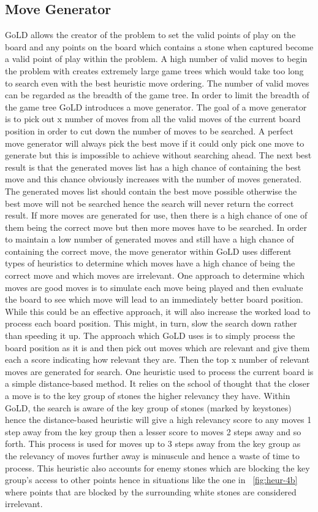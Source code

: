 \documentclass{l4proj}
\begin{document}
\subsection{Move Generator}
GoLD allows the creator of the problem to set the valid points of play on the board and any points on the board which contains a stone when captured become a valid point of play within the problem. A high number of valid moves to begin the problem with creates extremely large game trees which would take too long to search even with the best heuristic move ordering. The number of valid moves can be regarded as the breadth of the game tree. In order to limit the breadth of the game tree GoLD introduces a move generator.
The goal of a move generator is to pick out x number of moves from all the valid moves of the current board position in order to cut down the number of moves to be searched. A perfect move generator will always pick the best move if it could only pick one move to generate but this is impossible to achieve without searching ahead.  The next best result is that the generated moves list has a high chance of containing the best move and this chance obviously increases with the number of moves generated. The generated moves list should contain the best move possible otherwise the best move will not be searched hence the search will never return the correct result. If more moves are generated for use, then there is a high chance of one of them being the correct move but then more moves have to be searched. In order to maintain a low number of generated moves and still have a high chance of containing the correct move, the move generator within GoLD uses different types of heuristics to determine which moves have a high chance of being the correct move and which moves are irrelevant.
One approach to determine which moves are good moves is to simulate each move being played and then evaluate the board to see which move will lead to an immediately better board position. While this could be an effective approach, it will also increase the worked load to process each board position. This might, in turn, slow the search down rather than speeding it up. The approach which GoLD uses is to simply process the board position as it is and then pick out moves which are relevant and give them each a score indicating how relevant they are.  Then the top x number of relevant moves are generated for search.
One heuristic used to process the current board is a simple distance-based method. It relies on the school of thought that the closer a move is to the key group of stones the higher relevancy they have. Within GoLD, the search is aware of the key group of stones (marked by keystones) hence the distance-based heuristic will give a high relevancy score to any moves 1 step away from the key group then a lesser score to moves 2 steps away and so forth. This process is used for moves up to 3 steps away from the key group as the relevancy of moves further away is minuscule and hence a waste of time to process. This heuristic also accounts for enemy stones which are blocking the key group's access to other points hence in situations like the one in ~\autoref{fig:heur-4b} where points that are blocked by the surrounding white stones are considered irrelevant.
\end{document}

